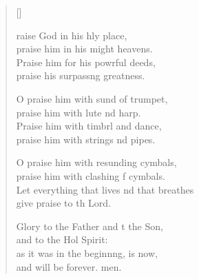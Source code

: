 \settowidth{\versewidth}{Let everything that lives and that breathes *}
\begin{verse}[\versewidth]
  \begin{patverse}
raise God in his hly place,\Med\\
praise him in his might heavens.\\
Praise him for his powrful deeds,\Med\\
praise his surpass\pointup{\i}ng greatness.

O praise him with sund of trumpet,\Med\\
praise him with lute nd harp.\\
Praise him with timbrl and dance,\Med\\
praise him with strings nd pipes.

O praise him with resunding cymbals,\Med\\
praise him with clashing f cymbals.\\
Let everything that lives nd that breathes\Med\\
give praise to th Lord.

Glory to the Father and t the Son,\Med\\
and to the Hol Spirit:\\
as it was in the beginn\pointup{\i}ng, is now,\Med\\
and will be forever. men. 
  \end{patverse}
\end{verse}
